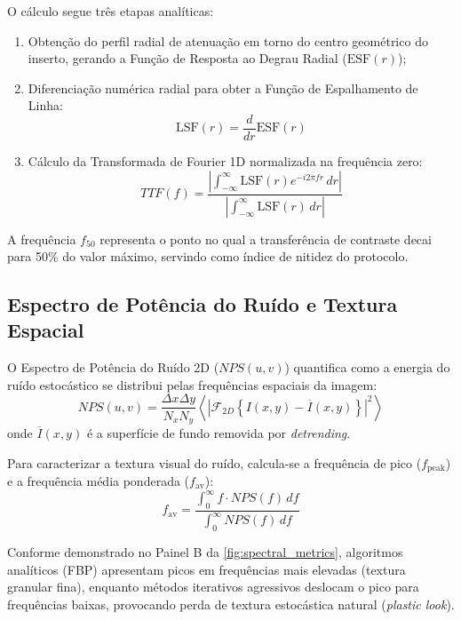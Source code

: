 O cálculo segue três etapas analíticas:
\begin{enumerate}
  \item Obtenção do perfil radial de atenuação em torno do centro geométrico do inserto, gerando a Função de Resposta ao Degrau Radial ($\text{ESF}(r)$);
  \item Diferenciação numérica radial para obter a Função de Espalhamento de Linha:
  \begin{equation}
    \text{LSF}(r) = \frac{d}{dr}\text{ESF}(r)
    \label{eq:lsf}
  \end{equation}
  \item Cálculo da Transformada de Fourier 1D normalizada na frequência zero:
  \begin{equation}
    TTF(f) = \frac{\left| \int_{-\infty}^{\infty} \text{LSF}(r) e^{-i 2\pi f r} \, dr \right|}{\left| \int_{-\infty}^{\infty} \text{LSF}(r) \, dr \right|}
    \label{eq:ttf_formula}
  \end{equation}
\end{enumerate}

A frequência $f_{50}$ representa o ponto no qual a transferência de contraste decai para 50\% do valor máximo, servindo como índice de nitidez do protocolo.

\subsection{Espectro de Potência do Ruído e Textura Espacial}
O Espectro de Potência do Ruído 2D ($NPS(u, v)$) quantifica como a energia do ruído estocástico se distribui pelas frequências espaciais da imagem:
\begin{equation}
  NPS(u, v) = \frac{\Delta x \Delta y}{N_x N_y} \left\langle \left| \mathcal{F}_{2D} \left\{ I(x, y) - \overline{I}(x, y) \right\} \right|^2 \right\rangle
  \label{eq:nps_formula}
\end{equation}
onde $\overline{I}(x, y)$ é a superfície de fundo removida por \emph{detrending}.

Para caracterizar a textura visual do ruído, calcula-se a frequência de pico ($f_{\text{peak}}$) e a frequência média ponderada ($f_{\text{av}}$):
\begin{equation}
  f_{\text{av}} = \frac{\int_{0}^{\infty} f \cdot NPS(f) \, df}{\int_{0}^{\infty} NPS(f) \, df}
  \label{eq:fav}
\end{equation}

Conforme demonstrado no Painel B da \cref{fig:spectral_metrics}, algoritmos analíticos (FBP) apresentam picos em frequências mais elevadas (textura granular fina), enquanto métodos iterativos agressivos deslocam o pico para frequências baixas, provocando perda de textura estocástica natural (\emph{plastic look}).

